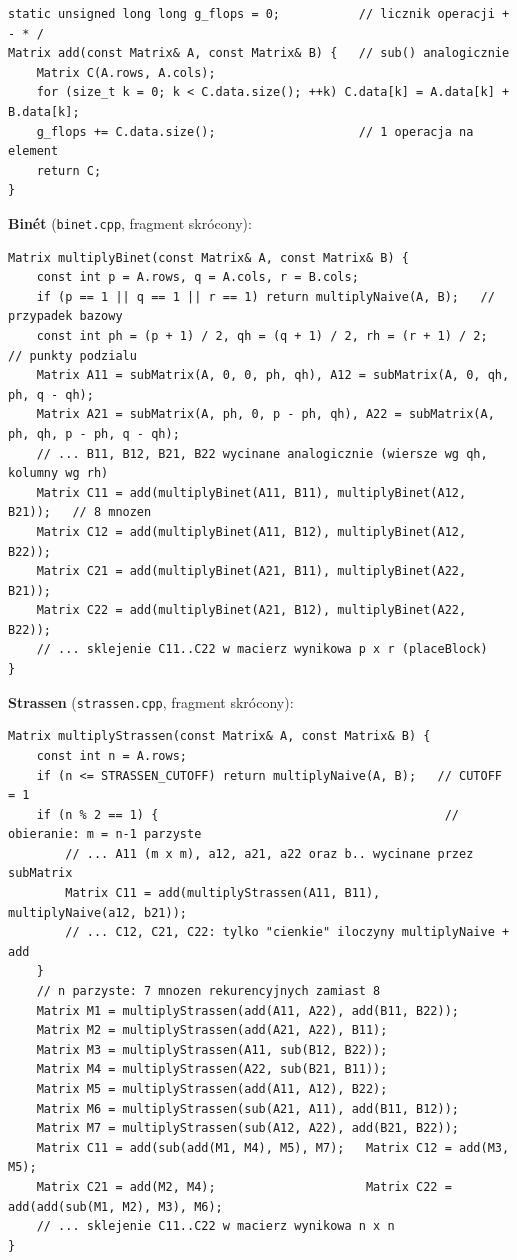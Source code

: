 \documentclass[10pt,a4paper]{article}
\begin{document}
\begin{lstlisting}
static unsigned long long g_flops = 0;           // licznik operacji + - * /
Matrix add(const Matrix& A, const Matrix& B) {   // sub() analogicznie
    Matrix C(A.rows, A.cols);
    for (size_t k = 0; k < C.data.size(); ++k) C.data[k] = A.data[k] + B.data[k];
    g_flops += C.data.size();                    // 1 operacja na element
    return C;
}
\end{lstlisting}

\textbf{Binét} (\texttt{binet.cpp}, fragment skrócony):
\begin{lstlisting}
Matrix multiplyBinet(const Matrix& A, const Matrix& B) {
    const int p = A.rows, q = A.cols, r = B.cols;
    if (p == 1 || q == 1 || r == 1) return multiplyNaive(A, B);   // przypadek bazowy
    const int ph = (p + 1) / 2, qh = (q + 1) / 2, rh = (r + 1) / 2;  // punkty podzialu
    Matrix A11 = subMatrix(A, 0, 0, ph, qh), A12 = subMatrix(A, 0, qh, ph, q - qh);
    Matrix A21 = subMatrix(A, ph, 0, p - ph, qh), A22 = subMatrix(A, ph, qh, p - ph, q - qh);
    // ... B11, B12, B21, B22 wycinane analogicznie (wiersze wg qh, kolumny wg rh)
    Matrix C11 = add(multiplyBinet(A11, B11), multiplyBinet(A12, B21));   // 8 mnozen
    Matrix C12 = add(multiplyBinet(A11, B12), multiplyBinet(A12, B22));
    Matrix C21 = add(multiplyBinet(A21, B11), multiplyBinet(A22, B21));
    Matrix C22 = add(multiplyBinet(A21, B12), multiplyBinet(A22, B22));
    // ... sklejenie C11..C22 w macierz wynikowa p x r (placeBlock)
}
\end{lstlisting}

\textbf{Strassen} (\texttt{strassen.cpp}, fragment skrócony):
\begin{lstlisting}
Matrix multiplyStrassen(const Matrix& A, const Matrix& B) {
    const int n = A.rows;
    if (n <= STRASSEN_CUTOFF) return multiplyNaive(A, B);   // CUTOFF = 1
    if (n % 2 == 1) {                                        // obieranie: m = n-1 parzyste
        // ... A11 (m x m), a12, a21, a22 oraz b.. wycinane przez subMatrix
        Matrix C11 = add(multiplyStrassen(A11, B11), multiplyNaive(a12, b21));
        // ... C12, C21, C22: tylko "cienkie" iloczyny multiplyNaive + add
    }
    // n parzyste: 7 mnozen rekurencyjnych zamiast 8
    Matrix M1 = multiplyStrassen(add(A11, A22), add(B11, B22));
    Matrix M2 = multiplyStrassen(add(A21, A22), B11);
    Matrix M3 = multiplyStrassen(A11, sub(B12, B22));
    Matrix M4 = multiplyStrassen(A22, sub(B21, B11));
    Matrix M5 = multiplyStrassen(add(A11, A12), B22);
    Matrix M6 = multiplyStrassen(sub(A21, A11), add(B11, B12));
    Matrix M7 = multiplyStrassen(sub(A12, A22), add(B21, B22));
    Matrix C11 = add(sub(add(M1, M4), M5), M7);   Matrix C12 = add(M3, M5);
    Matrix C21 = add(M2, M4);                     Matrix C22 = add(add(sub(M1, M2), M3), M6);
    // ... sklejenie C11..C22 w macierz wynikowa n x n
}
\end{lstlisting}
\end{document}
